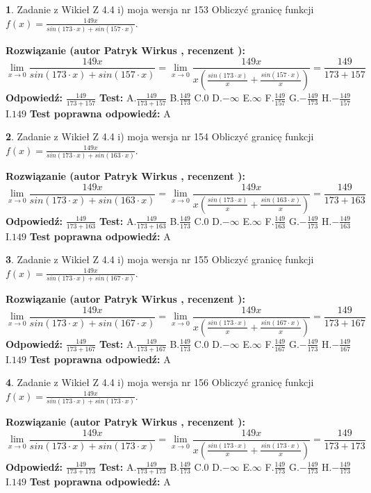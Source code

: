 \documentclass[12pt, a4paper]{article}
\theoremstyle{definition} %
\newtheorem{zad}{}
\newcommand{\zadStart}[1]{\begin{zad}#1\newline}
\newcommand{\zadStop}{\end{zad}}
\newcommand{\rozwStart}[2]{\noindent \textbf{Rozwiązanie (autor #1 , recenzent #2): }\newline}
\newcommand{\rozwStop}{\newline}
\newcommand{\odpStart}{\noindent \textbf{Odpowiedź:}\newline}
\newcommand{\odpStop}{\newline}
\newcommand{\testStart}{\noindent \textbf{Test:}\newline}
\newcommand{\testStop}{\newline}
\newcommand{\kluczStart}{\noindent \textbf{Test poprawna odpowiedź:}\newline}
\newcommand{\kluczStop}{\newline}
\begin{document}
\zadStart{Zadanie z Wikieł Z 4.4 i) moja wersja nr 153}
Obliczyć granicę funkcji $f(x)=\frac{149x}{sin(173\cdot x) +sin(157\cdot x)}$.
\zadStop
\rozwStart{Patryk Wirkus}{}
$$\lim\limits_{x\to 0}\frac{149x}{sin(173\cdot x) +sin(157\cdot x)}=\lim\limits_{x\to 0}\frac{149x}{x(\frac{sin(173\cdot x)}{x}+\frac{sin(157\cdot x)}{x})}=\frac{149}{173+157}$$
\rozwStop
\odpStart
$\frac{149}{173+157}$
\odpStop
\testStart
A.$\frac{149}{173+157}$
B.$\frac{149}{173}$
C.$0$
D.$-\infty$
E.$\infty$
F.$\frac{149}{157}$
G.$-\frac{149}{173}$
H.$-\frac{149}{157}$
I.$149$
\testStop
\kluczStart
A
\kluczStop



\zadStart{Zadanie z Wikieł Z 4.4 i) moja wersja nr 154}
Obliczyć granicę funkcji $f(x)=\frac{149x}{sin(173\cdot x) +sin(163\cdot x)}$.
\zadStop
\rozwStart{Patryk Wirkus}{}
$$\lim\limits_{x\to 0}\frac{149x}{sin(173\cdot x) +sin(163\cdot x)}=\lim\limits_{x\to 0}\frac{149x}{x(\frac{sin(173\cdot x)}{x}+\frac{sin(163\cdot x)}{x})}=\frac{149}{173+163}$$
\rozwStop
\odpStart
$\frac{149}{173+163}$
\odpStop
\testStart
A.$\frac{149}{173+163}$
B.$\frac{149}{173}$
C.$0$
D.$-\infty$
E.$\infty$
F.$\frac{149}{163}$
G.$-\frac{149}{173}$
H.$-\frac{149}{163}$
I.$149$
\testStop
\kluczStart
A
\kluczStop



\zadStart{Zadanie z Wikieł Z 4.4 i) moja wersja nr 155}
Obliczyć granicę funkcji $f(x)=\frac{149x}{sin(173\cdot x) +sin(167\cdot x)}$.
\zadStop
\rozwStart{Patryk Wirkus}{}
$$\lim\limits_{x\to 0}\frac{149x}{sin(173\cdot x) +sin(167\cdot x)}=\lim\limits_{x\to 0}\frac{149x}{x(\frac{sin(173\cdot x)}{x}+\frac{sin(167\cdot x)}{x})}=\frac{149}{173+167}$$
\rozwStop
\odpStart
$\frac{149}{173+167}$
\odpStop
\testStart
A.$\frac{149}{173+167}$
B.$\frac{149}{173}$
C.$0$
D.$-\infty$
E.$\infty$
F.$\frac{149}{167}$
G.$-\frac{149}{173}$
H.$-\frac{149}{167}$
I.$149$
\testStop
\kluczStart
A
\kluczStop



\zadStart{Zadanie z Wikieł Z 4.4 i) moja wersja nr 156}
Obliczyć granicę funkcji $f(x)=\frac{149x}{sin(173\cdot x) +sin(173\cdot x)}$.
\zadStop
\rozwStart{Patryk Wirkus}{}
$$\lim\limits_{x\to 0}\frac{149x}{sin(173\cdot x) +sin(173\cdot x)}=\lim\limits_{x\to 0}\frac{149x}{x(\frac{sin(173\cdot x)}{x}+\frac{sin(173\cdot x)}{x})}=\frac{149}{173+173}$$
\rozwStop
\odpStart
$\frac{149}{173+173}$
\odpStop
\testStart
A.$\frac{149}{173+173}$
B.$\frac{149}{173}$
C.$0$
D.$-\infty$
E.$\infty$
F.$\frac{149}{173}$
G.$-\frac{149}{173}$
H.$-\frac{149}{173}$
I.$149$
\testStop
\kluczStart
A
\kluczStop
\end{document}
